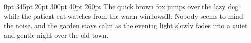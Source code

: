 \documentclass{article}
\begin{document}
 0pt 345pt 20pt 300pt 40pt 260pt The quick brown fox jumps over the lazy dog while the patient cat watches from the warm windowsill. Nobody seems to mind the noise, and the garden stays calm as the evening light slowly fades into a quiet and gentle night over the old town.
\end{document}
